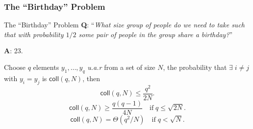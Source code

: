 \begin{frame}\frametitle{The ``Birthday'' Problem}
\begin{exampleblock}{The ``Birthday'' Problem}
\textbf{Q}: ``\emph{What size group of people do we need to take such that with probability $1/2$ some pair of people in the group share a birthday?}''

\textbf{A}: 23.
\end{exampleblock}
\begin{lemma}
Choose $q$ elements $y_1,\dotsc , y_q$ \emph{u.a.r} from a set of size $N$, the probability that $\exists \; i \ne j$ with $y_i = y_j$ is $\mathsf{coll}(q,N)$, then 
\[ \mathsf{coll}(q,N) \le \frac{q^2}{2N}.
\]
\[ \mathsf{coll}(q,N) \ge  \frac{q(q-1)}{4N}\quad \text{if}\; q \le \sqrt{2N}.
\]
\[ \mathsf{coll}(q,N) = \Theta(q^2/N)\quad \text{if}\; q < \sqrt{N}.
\]
\end{lemma}
\end{frame}
